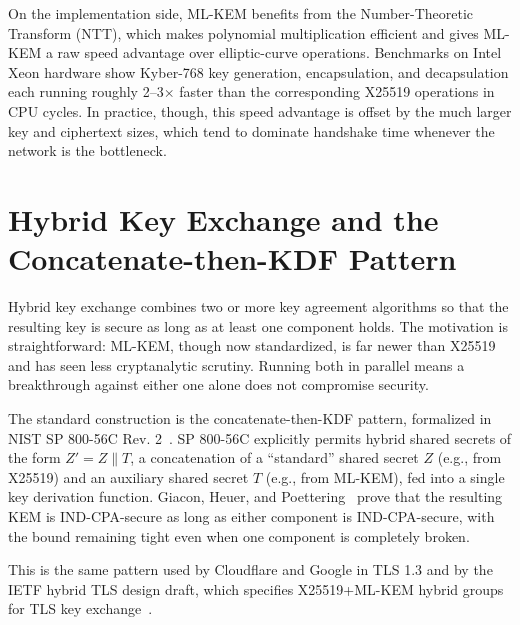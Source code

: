 On the implementation side, ML-KEM benefits from the Number-Theoretic Transform (NTT), which makes polynomial multiplication efficient and gives ML-KEM a raw speed advantage over elliptic-curve operations. Benchmarks on Intel Xeon hardware show Kyber-768 key generation, encapsulation, and decapsulation each running roughly 2--3$\times$ faster than the corresponding X25519 operations in CPU cycles. In practice, though, this speed advantage is offset by the much larger key and ciphertext sizes, which tend to dominate handshake time whenever the network is the bottleneck.

\section{Hybrid Key Exchange and the Concatenate-then-KDF Pattern}

Hybrid key exchange combines two or more key agreement algorithms so that the resulting key is secure as long as at least one component holds. The motivation is straightforward: ML-KEM, though now standardized, is far newer than X25519 and has seen less cryptanalytic scrutiny. Running both in parallel means a breakthrough against either one alone does not compromise security.

The standard construction is the concatenate-then-KDF pattern, formalized in NIST SP 800-56C Rev. 2~\cite{nist-sp800-56c}. SP 800-56C explicitly permits hybrid shared secrets of the form $Z' = Z \| T$, a concatenation of a ``standard'' shared secret $Z$ (e.g., from X25519) and an auxiliary shared secret $T$ (e.g., from ML-KEM), fed into a single key derivation function. Giacon, Heuer, and Poettering~\cite{giacon2018combiners} prove that the resulting KEM is IND-CPA-secure as long as either component is IND-CPA-secure, with the bound remaining tight even when one component is completely broken.

This is the same pattern used by Cloudflare and Google in TLS 1.3 and by the IETF hybrid TLS design draft, which specifies X25519+ML-KEM hybrid groups for TLS key exchange~\cite{ietf-tls-hybrid-design}.
